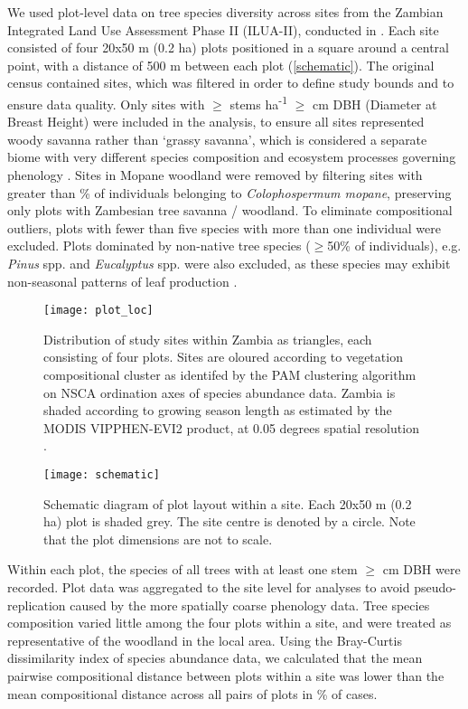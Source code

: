 \documentclass[11pt,a4paper]{article}
\begin{document}
We used plot-level data on tree species diversity across \nSites{} sites from the Zambian Integrated Land Use Assessment Phase II (ILUA-II), conducted in \censusDate{} \citep{Mukosha2009, Pelletier2018}. Each site consisted of four 20x50 m (0.2 ha) plots positioned in a square around a central point, with a distance of 500 m between each plot (\autoref{schematic}). The original census contained \nTotalSites{} sites, which was filtered in order to define study bounds and to ensure data quality. Only sites with $\geq$\stemsHa{} stems ha\textsuperscript{-1} $\geq$\stemSize{} cm DBH (Diameter at Breast Height) were included in the analysis, to ensure all sites represented woody savanna rather than `grassy savanna', which is considered a separate biome with very different species composition and ecosystem processes governing phenology \citep{Parr2014}. Sites in Mopane woodland were removed by filtering sites with greater than \mopanePer{}\% of individuals belonging to \textit{Colophospermum mopane}, preserving only plots with Zambesian tree savanna / woodland. To eliminate compositional outliers, plots with fewer than five species with more than one individual were excluded. Plots dominated by  non-native tree species ($\geq$50\% of individuals), e.g. \textit{Pinus} spp. and \textit{Eucalyptus} spp. were also excluded, as these species may exhibit non-seasonal patterns of leaf production \citep{}.

\begin{figure}[H]
\centering
	\texttt{[image: plot\_loc]}
	\caption{Distribution of study sites within Zambia as triangles, each consisting of four plots. Sites are oloured according to vegetation compositional cluster as identifed by the PAM clustering algorithm on NSCA ordination axes of species abundance data. Zambia is shaded according to growing season length as estimated by the MODIS VIPPHEN-EVI2 product, at 0.05 degrees spatial resolution \citep{VIPPHEN}.}
	\label{plot_loc}
\end{figure}

\begin{figure}[H]
\centering
	\texttt{[image: schematic]}
	\caption{Schematic diagram of plot layout within a site. Each 20x50 m (0.2 ha) plot is shaded grey. The site centre is denoted by a circle. Note that the plot dimensions are not to scale.}
	\label{schematic}
\end{figure}

Within each plot, the species of all trees with at least one stem $\geq$\stemSize{} cm DBH were recorded. Plot data was aggregated to the site level for analyses to avoid pseudo-replication caused by the more spatially coarse phenology data. Tree species composition varied little among the four plots within a site, and were treated as representative of the woodland in the local area. Using the Bray-Curtis dissimilarity index of species abundance data, we calculated that the mean pairwise compositional distance between plots within a site was lower than the mean compositional distance across all pairs of plots in \plotDistPer{}\% of cases. 
\end{document}
